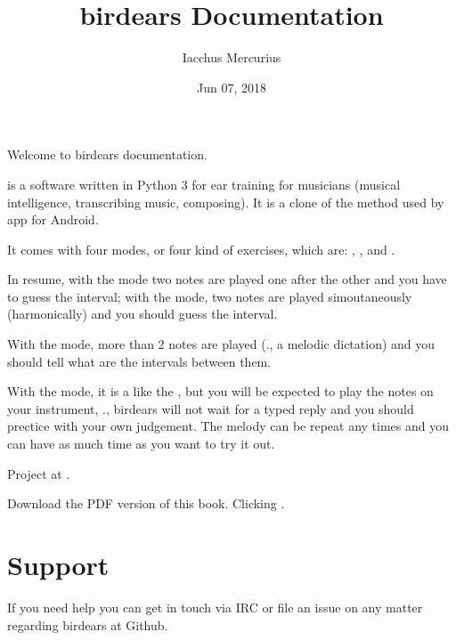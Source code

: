 \documentclass[letterpaper,10pt,english]{sphinxmanual}
\title{birdears Documentation}
\date{Jun 07, 2018}
\author{Iacchus Mercurius}
\begin{document}
\maketitle
\sphinxtableofcontents
{}\label{\detokenize{index::doc}}


Welcome to birdears documentation.

 is a software written in Python 3 for ear training for
musicians (musical intelligence, transcribing music, composing). It is a
clone of the method used by 
app for Android.

It comes with four modes, or four kind of exercises, which are:
, ,  and .

In resume, with the  mode two notes are played one after the
other and you have to guess the interval; with the  mode,
two notes are played simoutaneously (harmonically) and you should guess
the interval.

With the  mode, more than 2 notes are played (., a
melodic dictation) and you should tell what are the intervals between
them.

With the  mode, it is a like the , but you will
be expected to play the notes on your instrument, ., birdears will
not wait for a typed reply and you should prectice with your own
judgement. The melody can be repeat any times and you can have as much
time as you want to try it out.

Project at .

Download the PDF version of this book. Clicking .




\chapter{Support}
\label{\detokenize{community:birdears-documentation}}\label{\detokenize{community:support}}\label{\detokenize{community::doc}}
If you need help you can get in touch via IRC or file an issue on any matter regarding birdears at Github.
\end{document}
